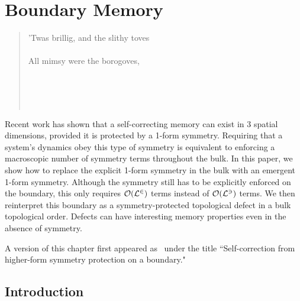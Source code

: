 
\chapter{Boundary Memory} \label{chp:boundary}

\vspace{-.35in}
\begin{quotation}
\begin{multicols}{2}
	\noindent 'Twas brillig, and the slithy toves \\
	 \\
	\noindent All mimsy were the borogoves, \\
	 

\raggedleft 
	\\
	\\
	\\
\end{multicols}
\end{quotation}
	
Recent work has shown that a self-correcting memory can exist in 3 spatial dimensions, provided it is protected by a 1-form symmetry. Requiring that a system's dynamics obey this type of symmetry is equivalent to enforcing a macroscopic number of symmetry terms throughout the bulk. In this paper, we show how to replace the explicit 1-form symmetry in the bulk with an emergent 1-form symmetry. Although the symmetry still has to be explicitly enforced on the boundary, this only requires $\cal{O}(L^2)$ terms instead of $\cal{O}(L^3)$ terms. We then reinterpret this boundary as a symmetry-protected topological defect in a bulk topological order. Defects can have interesting memory properties even in the absence of symmetry.

A version of this chapter first appeared as~\cite{Stahl2023Boundary} under the title ``Self-correction from higher-form symmetry protection on a boundary."

\section{Introduction} \label{sec:bdyintro}

